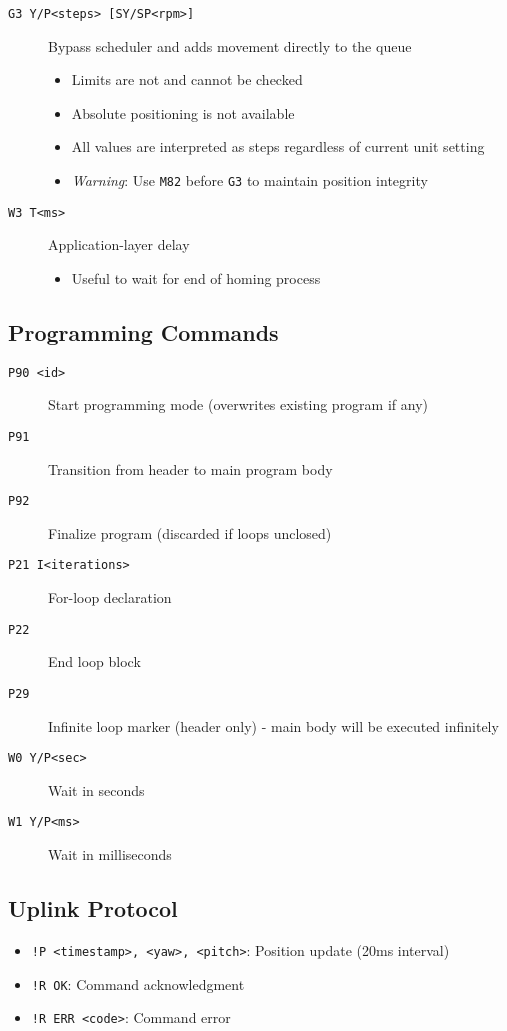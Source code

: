 \begin{description}
  \item[\texttt{G3 Y/P<steps> [SY/SP<rpm>]}] Bypass scheduler and adds movement directly to the queue
		\begin{itemize}
			\item Limits are not and cannot be checked
			\item Absolute positioning is not available
			\item All values are interpreted as steps regardless of current unit setting
			\item \textit{Warning}: Use \texttt{M82} before \texttt{G3} to maintain position integrity
		\end{itemize}
  \item[\texttt{W3 T<ms>}] Application-layer delay
		\begin{itemize}
			\item Useful to wait for end of homing process
		\end{itemize}
\end{description}

\subsection*{Programming Commands}
\begin{description}
  \item[\texttt{P90 <id>}] Start programming mode (overwrites existing program if any)
  \item[\texttt{P91}] Transition from header to main program body
  \item[\texttt{P92}] Finalize program (discarded if loops unclosed)
  \item[\texttt{P21 I<iterations>}] For-loop declaration
  \item[\texttt{P22}] End loop block
  \item[\texttt{P29}] Infinite loop marker (header only) - main body will be executed infinitely
  \item[\texttt{W0 Y/P<sec>}] Wait in seconds
  \item[\texttt{W1 Y/P<ms>}] Wait in milliseconds
\end{description}


\subsection*{Uplink Protocol}

\begin{itemize}
  \item \texttt{!P <timestamp>, <yaw>, <pitch>}: Position update (20ms interval)
  \item \texttt{!R OK}: Command acknowledgment
  \item \texttt{!R ERR <code>}: Command error
\end{itemize}

